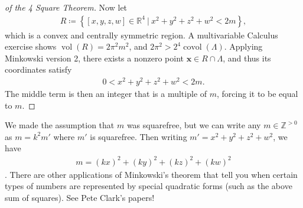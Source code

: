 \begin{proof}[of the 4 Square Theorem]
Now let
\begin{align*}
R \coloneqq\left\{{ {\left[ {x,y,z,w} \right]} \in {\mathbb{R}}^4 {~\mathrel{\Big|}~}x^2 + y^2 + z^2 + w ^2 < 2m  }\right\}
,\end{align*}
which is a convex and centrally symmetric region. A multivariable
Calculus exercise shows \(\operatorname{vol}(R) = 2\pi^2 m^2\), and
\(2\pi^2 > 2^4 \operatorname{covol}( \Lambda)\). Applying Minkowski
version 2, there exists a nonzero point
\(\mathbf{x} \in R \cap\Lambda\), and thus its coordinates satisfy
\begin{align*}
0 < x^2 + y^2 + z^2 + w^2 < 2m
.\end{align*}
The middle term is then an integer that is a multiple of \(m\), forcing
it to be equal to \(m\).

\end{proof}

\begin{remark}

We made the assumption that \(m\) was squarefree, but we can write any
\(m\in {\mathbb{Z}}^{>0}\) as \(m = k^2 m'\) where \(m'\) is squarefree.
Then writing \(m' = x^2 + y^2 + z^2 + w^2\), we have
\begin{align*} m = (kx)^2 + (ky)^2 + (kz)^2 + (kw)^2 \end{align*}
. There are other applications of Minkowski's theorem that tell you when
certain types of numbers are represented by special quadratic forms
(such as the above sum of squares). See Pete Clark's papers!

\end{remark}

\cleardoublepage

\renewcommand{\listtheoremname}{}
\listoftheorems[ignoreall,show={definition}, numwidth=3.5em]
\cleardoublepage

\renewcommand{\listtheoremname}{}
\listoftheorems[ignoreall,show={theorem,proposition}, numwidth=3.5em]
\cleardoublepage

\renewcommand{\listtheoremname}{}
\listoftheorems[ignoreall,show={exercise}, numwidth=3.5em]
\cleardoublepage

\listoffigures
\cleardoublepage


\printbibliography[title=Bibliography]



